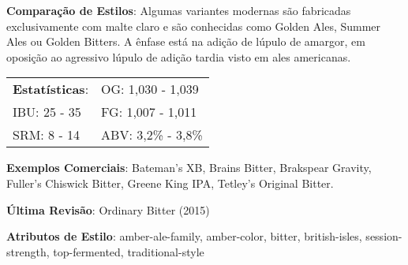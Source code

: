 \textbf{Comparação de Estilos}: Algumas variantes modernas são fabricadas exclusivamente com malte claro e são conhecidas como Golden Ales, Summer Ales ou Golden Bitters. A ênfase está na adição de lúpulo de amargor, em oposição ao agressivo lúpulo de adição tardia visto em ales americanas.

\begin{tabular}{@{}p{35mm}p{35mm}@{}}
  \textbf{Estatísticas}: & OG: 1,030 - 1,039 \\
  IBU: 25 - 35  & FG: 1,007 - 1,011  \\
  SRM: 8 - 14  & ABV: 3,2\% - 3,8\%
\end{tabular}

\textbf{Exemplos Comerciais}: Bateman’s XB, Brains Bitter, Brakspear Gravity, Fuller's Chiswick Bitter, Greene King IPA, Tetley’s Original Bitter.

\textbf{Última Revisão}: Ordinary Bitter (2015)

\textbf{Atributos de Estilo}: amber-ale-family, amber-color, bitter, british-isles, session-strength, top-fermented, traditional-style